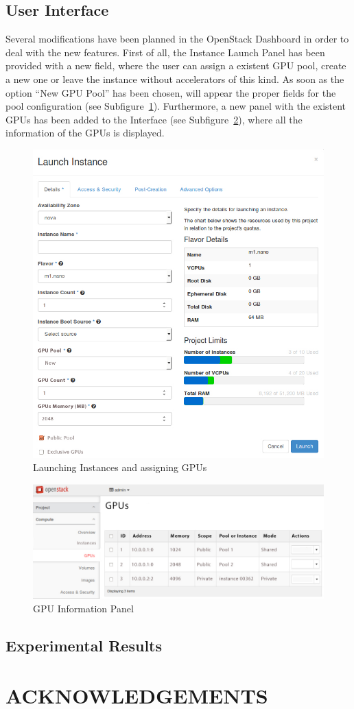 \documentclass[a4paper,twoside]{article}
\begin{document}
\subsection{User Interface}
Several modifications have been planned in the OpenStack Dashboard in order to deal with the new features.
First of all, the Instance Launch Panel has been provided with a new field, where the user can assign a existent GPU pool, create a new one or leave the instance without accelerators of this kind.
As soon as the option ``New GPU Pool'' has been chosen, will appear the proper fields for the pool configuration (see Subfigure~\ref{fig:ui-launch}).
Furthermore, a new panel with the existent GPUs has been added to the Interface (see Subfigure~\ref{fig:ui-rgpus}), where all the information of the GPUs is displayed.

\begin{figure}[!t]
  \centering
  \includegraphics[width=.9\linewidth]{images/UI-launch.jpg}
  \caption{Launching Instances and assigning GPUs}
  \label{fig:ui-launch}
\end{figure}
  
\begin{figure}[!t]
  \centering
  \includegraphics[width=.85\linewidth]{images/UI-rgpus.jpg}
  \caption{GPU Information Panel}
  \label{fig:ui-rgpus}
\end{figure}

\subsection{Experimental Results}


\section*{\uppercase{Acknowledgements}}


{\small
}
\end{document}
